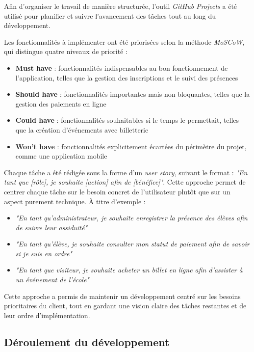 \documentclass{article}
\begin{document}
Afin d'organiser le travail de manière structurée, l'outil \textit{GitHub 
Projects} a été utilisé pour planifier et suivre l'avancement des tâches 
tout au long du développement.

Les fonctionnalités à implémenter ont été priorisées selon la méthode 
\textit{MoSCoW}, qui distingue quatre niveaux de priorité :

\begin{itemize}
    \item \textbf{Must have} : fonctionnalités indispensables au bon 
    fonctionnement de l'application, telles que la gestion des inscriptions 
    et le suivi des présences
    \item \textbf{Should have} : fonctionnalités importantes mais non 
    bloquantes, telles que la gestion des paiements en ligne
    \item \textbf{Could have} : fonctionnalités souhaitables si le temps 
    le permettait, telles que la création d'événements avec billetterie
    \item \textbf{Won't have} : fonctionnalités explicitement écartées 
    du périmètre du projet, comme une application mobile
\end{itemize}

Chaque tâche a été rédigée sous la forme d'un \textit{user story}, 
suivant le format : \textit{"En tant que [rôle], je souhaite [action] 
afin de [bénéfice]"}. Cette approche permet de centrer chaque tâche 
sur le besoin concret de l'utilisateur plutôt que sur un aspect 
purement technique. À titre d'exemple :

\begin{itemize}
    \item \textit{"En tant qu'administrateur, je souhaite enregistrer 
    la présence des élèves afin de suivre leur assiduité"}
    \item \textit{"En tant qu'élève, je souhaite consulter mon statut 
    de paiement afin de savoir si je suis en ordre"}
    \item \textit{"En tant que visiteur, je souhaite acheter un billet 
    en ligne afin d'assister à un événement de l'école"}
\end{itemize}
Cette approche a permis de maintenir un développement centré sur les 
besoins prioritaires du client, tout en gardant une vision claire des 
tâches restantes et de leur ordre d'implémentation.

\subsection{Déroulement du développement}
\end{document}
